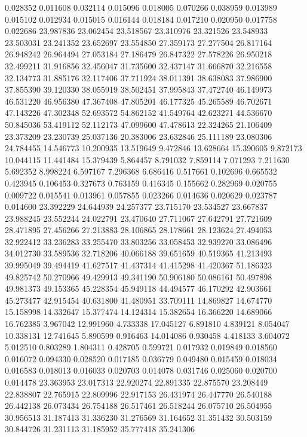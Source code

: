 0.028352
0.011608
0.032114
0.015096
0.018005
0.070266
0.038959
0.013989
0.015102
0.012934
0.015015
0.016144
0.018184
0.017210
0.020950
0.017758
0.022686
23.987836
23.062454
23.518567
23.310976
23.321526
23.548933
23.503031
23.241352
23.652697
23.554850
27.359173
27.277504
26.817164
26.948242
26.964494
27.053184
27.186479
26.847322
27.578226
26.950218
32.499211
31.916856
32.456047
31.735600
32.437147
31.666870
32.216558
32.134773
31.885176
32.117406
37.711924
38.011391
38.638083
37.986900
37.855390
39.120330
38.055919
38.502451
37.995843
37.472740
46.149973
46.531220
46.956380
47.367408
47.805201
46.177325
45.265589
46.702671
47.143226
47.302348
52.693572
54.862152
41.549764
42.623271
44.536670
50.845036
53.419112
52.112173
47.099600
47.478613
22.324265
21.106409
23.373209
23.230739
25.037136
20.383006
23.632846
25.111189
23.080306
24.784455
14.546773
10.200935
13.519649
9.472846
13.628664
15.390605
9.872173
10.044115
11.441484
15.379439
5.864457
8.791032
7.859114
7.071293
7.211630
5.692352
8.998224
6.597167
7.296368
6.686416
0.517661
0.102696
0.665532
0.423945
0.106453
0.327673
0.763159
0.416345
0.155662
0.282969
0.020755
0.009722
0.015541
0.013961
0.057855
0.023266
0.014636
0.020629
0.023787
0.014600
23.392229
24.644939
24.257377
23.715170
23.534527
23.667837
23.988245
23.552244
24.022791
23.470640
27.711067
27.642791
27.721609
28.471895
27.456266
27.213883
28.106865
28.178661
28.123624
27.494053
32.922412
33.236283
33.255470
33.803256
33.058453
32.939270
33.086496
34.012730
33.589536
32.718206
40.066188
39.651659
40.519365
41.213493
39.995049
39.494419
41.627517
41.437314
41.415298
41.420367
51.186323
49.825742
50.270966
49.429913
49.341190
50.906180
50.086161
50.497898
49.981373
49.153365
45.228354
45.949118
44.494577
46.170292
42.903661
45.273477
42.915454
40.631800
41.480951
33.709111
14.869827
14.674770
15.158998
14.332647
15.377474
14.124314
15.382654
16.366220
14.689066
16.762385
3.967042
12.991960
4.733338
17.045127
6.891810
4.839121
8.054047
10.338131
12.741645
5.890599
0.916463
14.014086
0.930458
4.418133
3.604072
5.012510
0.803289
1.804311
0.428705
0.599721
0.017932
0.019849
0.018560
0.016072
0.094330
0.028520
0.017185
0.036779
0.049480
0.015459
0.018034
0.016583
0.018013
0.016033
0.020703
0.014078
0.031746
0.025060
0.020700
0.014478
23.363953
23.017313
22.920274
22.891335
22.875570
23.208449
22.838807
22.765915
22.809996
22.917153
26.431974
26.447770
26.540188
26.442138
26.073434
26.754188
26.517461
26.518244
26.075710
26.504955
30.956513
31.187413
31.336230
31.276569
31.164652
31.351432
30.503159
30.844726
31.231113
31.185952
35.777418
35.241306
